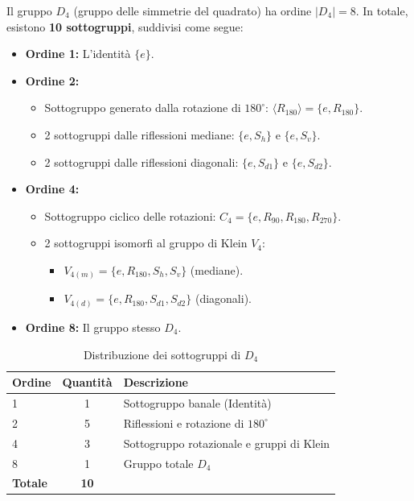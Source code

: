 Il gruppo $D_4$ (gruppo delle simmetrie del quadrato) ha ordine $|D_4| = 8$. In totale, esistono \textbf{10 sottogruppi}, suddivisi come segue:

\begin{itemize}
    \item \textbf{Ordine 1:} L'identità $\{e\}$.
    \item \textbf{Ordine 2:} 
    \begin{itemize}
        \item Sottogruppo generato dalla rotazione di $180^\circ$: $\langle R_{180} \rangle = \{e, R_{180}\}$.
        \item 2 sottogruppi dalle riflessioni mediane: $\{e, S_h\}$ e $\{e, S_v\}$.
        \item 2 sottogruppi dalle riflessioni diagonali: $\{e, S_{d1}\}$ e $\{e, S_{d2}\}$.
    \end{itemize}
    \item \textbf{Ordine 4:}
    \begin{itemize}
        \item Sottogruppo ciclico delle rotazioni: $C_4 = \{e, R_{90}, R_{180}, R_{270}\}$.
        \item 2 sottogruppi isomorfi al gruppo di Klein $V_4$:
        \begin{itemize}
            \item $V_{4(m)} = \{e, R_{180}, S_h, S_v\}$ (mediane).
            \item $V_{4(d)} = \{e, R_{180}, S_{d1}, S_{d2}\}$ (diagonali).
        \end{itemize}
    \end{itemize}
    \item \textbf{Ordine 8:} Il gruppo stesso $D_4$.
\end{itemize}

\begin{table}[h]
\centering
\begin{tabular}{lcl}
\toprule
\textbf{Ordine} & \textbf{Quantità} & \textbf{Descrizione} \\
\midrule
1 & 1 & Sottogruppo banale (Identità) \\
2 & 5 & Riflessioni e rotazione di $180^\circ$ \\
4 & 3 & Sottogruppo rotazionale e gruppi di Klein \\
8 & 1 & Gruppo totale $D_4$ \\
\midrule
\textbf{Totale} & \textbf{10} & \\
\bottomrule
\end{tabular}
\caption{Distribuzione dei sottogruppi di $D_4$}
\end{table}

